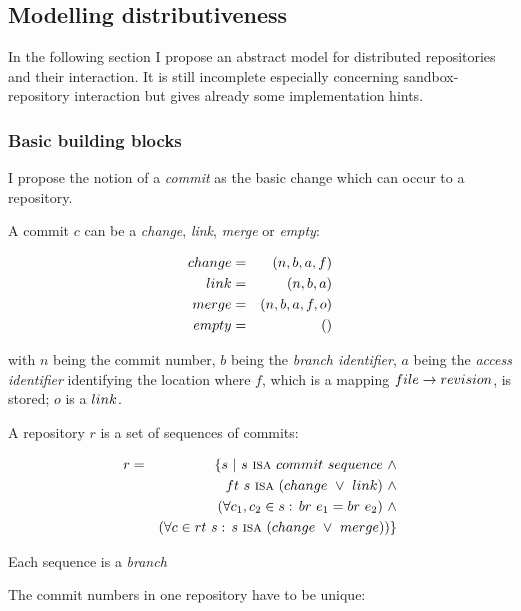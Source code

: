 \documentclass[fleqn, german, 10pt, a4paper]{article}
\begin{document}
\subsection{Modelling distributiveness}

In the following section I propose an abstract model for distributed
repositories and their interaction. It is still incomplete
especially concerning sandbox-repository interaction but gives already
some implementation hints.

\subsubsection{Basic building blocks}

I propose the notion of a \emph{commit} as the basic change which can
occur to a repository.

A commit $c$ can be a \emph{change}, \emph{link},
\emph{merge} or \emph{empty}:

\begin{eqnarray*}
\mathnormal{change} &=& (n, b, a, f) \\
\mathnormal{link}   &=& (n, b, a) \\
\mathnormal{merge}  &=& (n, b, a, f, o) \\
\mathnormal{empty}  &=& ()
\end{eqnarray*}

with $n$ being the commit number, $b$ being the \emph{branch identifier},
$a$ being the \emph{access identifier} identifying the location where
$f$, which is a mapping
$\mathnormal{file} \rightarrow \mathnormal{revision}$, is stored; $o$
is a $\mathnormal{link}$.

A repository $r$ is a set of sequences of commits:

\begin{eqnarray*}
r &=& \{s\ |\ s \ \mbox{\textsc{isa}}\ \mathnormal{commit}\ \mathnormal{sequence} \ \wedge \\
&&    \mathnormal{ft}\ s\ \mbox{\textsc{isa}}\
      (\mathnormal{change} \ \vee \ \mathnormal{link})\ \wedge \\
&&    (\forall c_1, c_2 \in s:\, \mathnormal{br}\ e_1 = \mathnormal{br}\ e_2)\ \wedge \\
&&    (\forall c \in \mathnormal{rt}\ s:\, s\ \mbox{\textsc{isa}}\
      (\mathnormal{change} \ \vee \ \mathnormal{merge}))\}
\end{eqnarray*}

Each sequence is a \emph{branch}

The commit numbers in one repository have to be unique:
\end{document}
